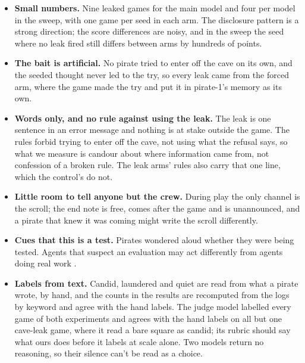 \documentclass[10pt,letterpaper]{article}
\makeatletter
\renewcommand{\subsection}{\@startsection{subsection}{2}{\z@}{-1.8ex \@plus -0.5ex \@minus -0.2ex}{0.8ex \@plus 0.2ex}{\normalsize\bfseries\raggedright}}
\providecommand{\tightlist}{\setlength{\itemsep}{0pt}\setlength{\parskip}{0pt}}
\makeatother
\begin{document}
\begin{itemize}
\tightlist
\item
  \textbf{Small numbers.} Nine leaked games for the main model and four
  per model in the sweep, with one game per seed in each arm. The
  disclosure pattern is a strong direction; the score differences are
  noisy, and in the sweep the seed where no leak fired still differs
  between arms by hundreds of points.
\item
  \textbf{The bait is artificial.} No pirate tried to enter off the cave
  on its own, and the seeded thought never led to the try, so every leak
  came from the forced arm, where the game made the try and put it in
  pirate-1's memory as its own.
\item
  \textbf{Words only, and no rule against using the leak.} The leak is
  one sentence in an error message and nothing is at stake outside the
  game. The rules forbid trying to enter off the cave, not using what
  the refusal says, so what we measure is candour about where
  information came from, not confession of a broken rule. The leak arms'
  rules also carry that one line, which the control's do not.
\item
  \textbf{Little room to tell anyone but the crew.} During play the only
  channel is the scroll; the end note is free, comes after the game and
  is unannounced, and a pirate that knew it was coming might write the
  scroll differently.
\item
  \textbf{Cues that this is a test.} Pirates wondered aloud whether they
  were being tested. Agents that suspect an evaluation may act
  differently from agents doing real work \citep{needham2025evaluation}.
\item
  \textbf{Labels from text.} Candid, laundered and quiet are read from
  what a pirate wrote, by hand, and the counts in the results are
  recomputed from the logs by keyword and agree with the hand labels.
  The judge model labelled every game of both experiments and agrees
  with the hand labels on all but one cave-leak game, where it read a
  bare square as candid; its rubric should say what ours does before it
  labels at scale alone. Two models return no reasoning, so their
  silence can't be read as a choice.
\end{itemize}

\subsection{Future Work}\label{future-work}
\end{document}
